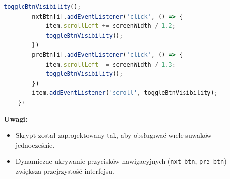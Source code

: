 \documentclass[12pt,a4paper,oneside]{article}
\theoremstyle{definition}
\numberwithin{equation}{section}
\begin{document}
\begin{itemize}
\begin{lstlisting}[language=JavaScript, caption=Skrypt \texttt{home\_page.js}]
        toggleBtnVisibility();
        nxtBtn[i].addEventListener('click', () => {
            item.scrollLeft += screenWidth / 1.2;
            toggleBtnVisibility();
        })
        preBtn[i].addEventListener('click', () => {
            item.scrollLeft -= screenWidth / 1.3;
            toggleBtnVisibility();
        })
        item.addEventListener('scroll', toggleBtnVisibility);
    })
        \end{lstlisting}
        \textbf{Uwagi:}
        \begin{itemize}
            \item Skrypt został zaprojektowany tak, aby obsługiwać wiele suwaków jednocześnie.
            \item Dynamiczne ukrywanie przycisków nawigacyjnych (\texttt{nxt-btn}, \texttt{pre-btn}) zwiększa przejrzystość interfejsu.
        \end{itemize}
\end{itemize}
\end{document}
